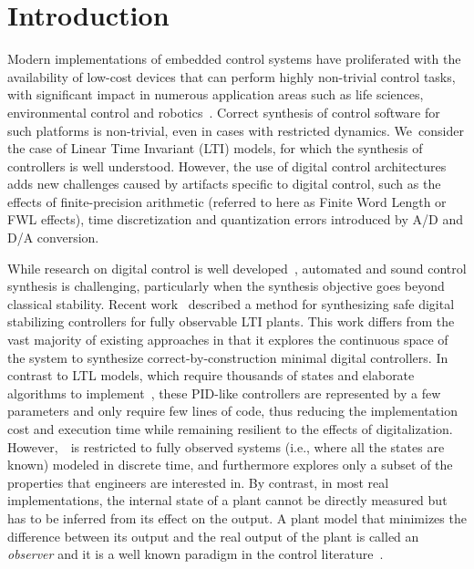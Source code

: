 \documentclass[sigconf]{llncs}
\begin{document}
\section{Introduction}

Modern implementations of embedded control systems have proliferated with
the availability of low-cost devices that can perform highly non-trivial
control tasks, with significant impact in numerous application areas such as
life sciences, environmental control and robotics~\cite{astrom1997computer,
Franklin15}.  Correct synthesis of control software for such platforms is
non-trivial, even in cases with restricted dynamics.  We~consider the case
of Linear Time Invariant (LTI) models, for which the synthesis of
controllers is well understood.  However, the use of digital control
architectures adds new challenges caused by artifacts specific to digital
control, such as the effects of finite-precision arithmetic (referred to
here as Finite Word Length or FWL effects), time discretization and
quantization errors introduced by A/D and D/A conversion.

While research on digital control is well
developed~\cite{astrom1997computer}, automated and sound control synthesis
is challenging, particularly when the synthesis objective goes beyond
classical stability.  Recent work~\cite{abate2017automated} described a
method for synthesizing safe digital stabilizing controllers for fully
observable LTI plants.  This work differs from the vast majority of existing
approaches in that it explores the continuous space of the system to
synthesize correct-by-construction minimal digital controllers.  In contrast
to LTL models, which require thousands of states and elaborate algorithms to
implement~\cite{reissig2017feedback}, these PID-like controllers are
represented by a few parameters and only require few lines of code, thus
reducing the implementation cost and execution time while remaining
resilient to the effects of digitalization. 
However,~\cite{abate2017automated}~is restricted to fully observed systems
(i.e., where all the states are known) modeled in discrete time, and
furthermore explores only a subset of the properties that engineers are
interested in.  By contrast, in most real implementations, the internal
state of a plant cannot be directly measured but has to be inferred from its
effect on the output.  A plant model that minimizes the difference between
its output and the real output of the plant is called an \emph{observer} and
it is a well known paradigm in the control
literature~\cite{astrom1997computer}.
\end{document}
